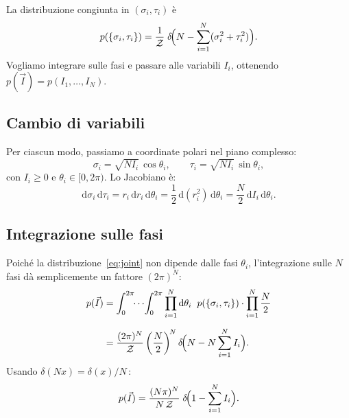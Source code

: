 \documentclass[a4paper,11pt]{article}
\newcommand{\de}{\mathrm{d}}
\begin{document}
La distribuzione congiunta in $(\sigma_i, \tau_i)$ è
\begin{equation}\label{eq:joint}
  p(\{\sigma_i, \tau_i\})
  = \frac{1}{\mathcal{Z}}\;
    \delta\!\Bigl(N - \sum_{i=1}^{N} (\sigma_i^2 + \tau_i^2)\Bigr) .
\end{equation}
Vogliamo integrare sulle fasi e passare alle variabili $I_i$, ottenendo
$p(\vec{I}) = p(I_1, \dots, I_N)$.

\subsection{Cambio di variabili}

Per ciascun modo, passiamo a coordinate polari nel piano complesso:
\begin{equation}
  \sigma_i = \sqrt{N I_i}\,\cos\theta_i , \qquad
  \tau_i   = \sqrt{N I_i}\,\sin\theta_i ,
\end{equation}
con $I_i \geq 0$ e $\theta_i \in [0, 2\pi)$.  Lo Jacobiano è:
\begin{equation}
  \de\sigma_i\,\de\tau_i
  = r_i\,\de r_i\,\de\theta_i
  = \frac{1}{2}\,\de(r_i^2)\,\de\theta_i
  = \frac{N}{2}\,\de I_i\,\de\theta_i .
\end{equation}

\subsection{Integrazione sulle fasi}

Poiché la distribuzione~\eqref{eq:joint} non dipende dalle fasi
$\theta_i$, l'integrazione sulle $N$ fasi dà semplicemente un fattore
$(2\pi)^N$:
\begin{align}
  p(\vec{I})
  &= \int_0^{2\pi}\!\!\cdots\!\int_0^{2\pi}
     \prod_{i=1}^{N} \de\theta_i \;\;
     p(\{\sigma_i,\tau_i\}) \cdot
     \prod_{i=1}^{N} \frac{N}{2} \nonumber\\[6pt]
  &= \frac{(2\pi)^N}{\mathcal{Z}}
     \left(\frac{N}{2}\right)^{\!N}
     \delta\!\Bigl(N - N\sum_{i=1}^{N} I_i\Bigr) .
\end{align}
Usando $\delta(Nx) = \delta(x)/N$\,:
\begin{equation}\label{eq:pI_step}
  p(\vec{I})
  = \frac{(N\pi)^N}{N\,\mathcal{Z}}\;
    \delta\!\Bigl(1 - \sum_{i=1}^{N} I_i\Bigr) .
\end{equation}
\end{document}
